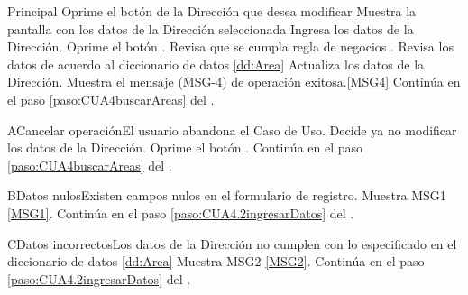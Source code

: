 	\begin{UCtrayectoria}{Principal}
			\UCpaso[\UCactor] Oprime el botón  de la Dirección que desea modificar 	\UCpaso Muestra la pantalla  con los datos de la Dirección seleccionada 
			\UCpaso [\UCactor] Ingresa los datos de la Dirección.\label{paso:CUA4.2ingresarDatos}
			\UCpaso [\UCactor] Oprime el botón .
			\UCpaso Revisa que se cumpla regla de negocios . 
			\UCpaso Revisa los datos de acuerdo al diccionario de datos \ref{dd:Area} 
			\UCpaso Actualiza los datos de la Dirección.
			\UCpaso Muestra el mensaje (MSG-4) de operación exitosa.\ref{MSG4}
			\UCpaso Continúa en el paso \ref{paso:CUA4buscarAreas} del .
	\end{UCtrayectoria}
	\newpage
		\begin{UCtrayectoriaA}{A}{Cancelar operación}{El usuario abandona el Caso de Uso.}
			\UCpaso[\UCactor] Decide ya no modificar los datos de la Dirección.
			\UCpaso[\UCactor] Oprime el botón .
			\UCpaso Continúa en el paso \ref{paso:CUA4buscarAreas} del .
		\end{UCtrayectoriaA}
		
		 \begin{UCtrayectoriaA}{B}{Datos nulos}{Existen campos nulos en el formulario de registro.}
			\UCpaso Muestra MSG1 \ref{MSG1}.
			\UCpaso Continúa en el paso \ref{paso:CUA4.2ingresarDatos} del .
		\end{UCtrayectoriaA}
		 \begin{UCtrayectoriaA}{C}{Datos incorrectos}{Los datos de la Dirección no cumplen con lo especificado en el diccionario de datos \ref{dd:Area}}
			\UCpaso Muestra MSG2 \ref{MSG2}.
			\UCpaso Continúa en el paso \ref{paso:CUA4.2ingresarDatos} del .
		\end{UCtrayectoriaA}



